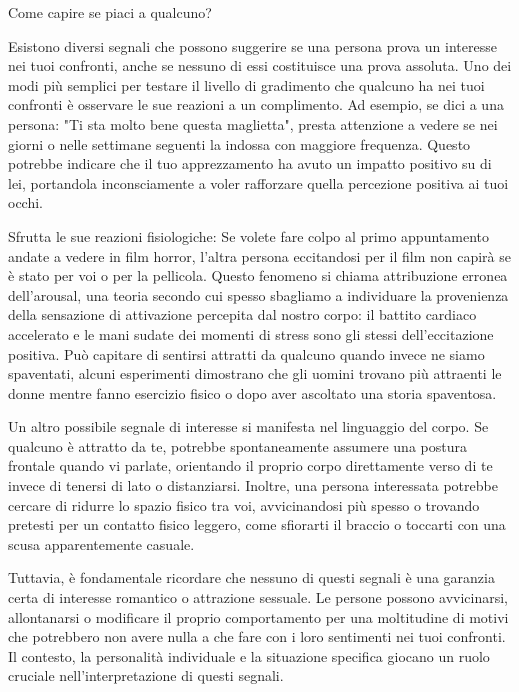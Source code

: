 \documentclass[12pt]{book} %
\begin{document}
\begin{mdframed}[linewidth=1pt]
Come capire se piaci a qualcuno?

Esistono diversi segnali che possono suggerire se una persona prova un interesse nei tuoi confronti, anche se nessuno di essi costituisce una prova assoluta. Uno dei modi più semplici per testare il livello di gradimento che qualcuno ha nei tuoi confronti è osservare le sue reazioni a un complimento. Ad esempio, se dici a una persona: "Ti sta molto bene questa maglietta", presta attenzione a vedere se nei giorni o nelle settimane seguenti la indossa con maggiore frequenza. Questo potrebbe indicare che il tuo apprezzamento ha avuto un impatto positivo su di lei, portandola inconsciamente a voler rafforzare quella percezione positiva ai tuoi occhi.

Sfrutta le sue reazioni fisiologiche: Se volete fare colpo al primo appuntamento andate a vedere in film horror,
l'altra persona eccitandosi per il film non capirà se è stato per voi o per la pellicola. Questo fenomeno si chiama
attribuzione erronea dell'arousal, una teoria secondo cui spesso sbagliamo a individuare la provenienza della
sensazione di attivazione percepita dal nostro corpo: il battito cardiaco accelerato e le mani sudate dei momenti di
stress sono gli stessi dell'eccitazione positiva. Può capitare di sentirsi attratti da qualcuno quando invece ne siamo
spaventati, alcuni esperimenti dimostrano che gli uomini trovano più attraenti le donne mentre fanno esercizio fisico o dopo aver
ascoltato una storia spaventosa.

Un altro possibile segnale di interesse si manifesta nel linguaggio del corpo. Se qualcuno è attratto da te, potrebbe spontaneamente assumere una postura frontale quando vi parlate, orientando il proprio corpo direttamente verso di te invece di tenersi di lato o distanziarsi. Inoltre, una persona interessata potrebbe cercare di ridurre lo spazio fisico tra voi, avvicinandosi più spesso o trovando pretesti per un contatto fisico leggero, come sfiorarti il braccio o toccarti con una scusa apparentemente casuale.

Tuttavia, è fondamentale ricordare che nessuno di questi segnali è una garanzia certa di interesse romantico o attrazione sessuale. Le persone possono avvicinarsi, allontanarsi o modificare il proprio comportamento per una moltitudine di motivi che potrebbero non avere nulla a che fare con i loro sentimenti nei tuoi confronti. Il contesto, la personalità individuale e la situazione specifica giocano un ruolo cruciale nell’interpretazione di questi segnali.
\end{mdframed}
\end{document}
